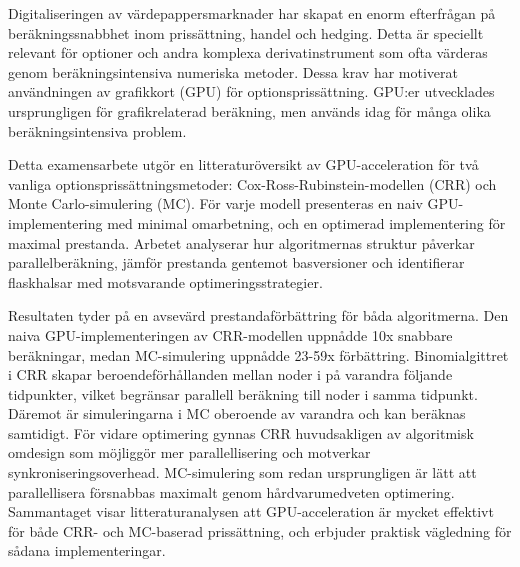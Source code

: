 \documentclass[english,12pt,a4paper,pdftex,sci,utf8]{aaltothesis}
\begin{document}
\newpage
%
%
\begin{abstractpage}[swedish]
Digitaliseringen av värdepappersmarknader har skapat en enorm efterfrågan på beräkningssnabbhet inom prissättning, handel och hedging. Detta är speciellt relevant för optioner och andra komplexa derivatinstrument som ofta värderas genom beräkningsintensiva numeriska metoder. Dessa krav har motiverat användningen av grafikkort (GPU) för optionsprissättning. GPU:er utvecklades ursprungligen för grafikrelaterad beräkning, men används idag för många olika beräkningsintensiva problem.

Detta examensarbete utgör en litteraturöversikt av GPU-acceleration för två vanliga optionsprissättningsmetoder: Cox-Ross-Rubinstein-modellen (CRR) och Monte Carlo-simulering (MC). För varje modell presenteras en naiv GPU-implementering med minimal omarbetning, och en optimerad implementering för maximal prestanda. Arbetet analyserar hur algoritmernas struktur påverkar parallelberäkning, jämför prestanda gentemot basversioner och identifierar flaskhalsar med motsvarande optimeringsstrategier.

Resultaten tyder på en avsevärd prestandaförbättring för båda algoritmerna. Den naiva GPU-implementeringen av CRR-modellen uppnådde 10x snabbare beräkningar, medan MC-simulering uppnådde 23-59x förbättring. Binomialgittret i CRR skapar beroendeförhållanden mellan noder i på varandra följande tidpunkter, vilket begränsar parallell beräkning till noder i samma tidpunkt. Däremot är simuleringarna i MC oberoende av varandra och kan beräknas samtidigt. För vidare optimering gynnas CRR huvudsakligen av algoritmisk omdesign som möjliggör mer parallellisering och motverkar synkroniseringsoverhead. MC-simulering som redan ursprungligen är lätt att parallellisera försnabbas maximalt genom hårdvarumedveten optimering. Sammantaget visar litteraturanalysen att GPU-acceleration är mycket effektivt för både CRR- och MC-baserad prissättning, och erbjuder praktisk vägledning för sådana implementeringar.
\end{abstractpage}
\end{document}
